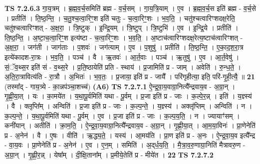 \documentclass[17pt]{extarticle}
\begin{document}
                  \newline
                                \textbf{ TS 7.2.6.3} \newline
                  गा॒य॒त्रम् । ब्र॒ह्म॒व॒र्च॒समिति॑ ब्रह्म - व॒र्च॒सम् । गा॒य॒त्रि॒याम् । ए॒व । ब्र॒ह्म॒व॒र्च॒स इति॑ ब्रह्म - व॒र्च॒से । प्रतीति॑ । ति॒ष्ठ॒न्ति॒ । च॒तु॒श्च॒त्वा॒रिꣳ॒॒श इति॑ चतुः - च॒त्वा॒रिꣳ॒॒शः । भ॒व॒ति॒ । चतु॑श्चत्वारिꣳशदक्ष॒रेति॒ चतु॑श्चत्वारिꣳशत् - अ॒क्ष॒रा॒ । त्रि॒ष्टुक् । इ॒न्द्रि॒यम् । त्रि॒ष्टुप् । त्रि॒ष्टुभि॑ । ए॒व । इ॒न्द्रि॒ये । प्रतीति॑ । ति॒ष्ठ॒न्ति॒ । अ॒ष्टा॒च॒त्वा॒रिꣳ॒॒श इत्य॑ष्टा - च॒त्वा॒रिꣳ॒॒शः । भ॒व॒ति॒ । अ॒ष्टाच॑त्वारिꣳशदक्ष॒रेत्य॒ष्टाच॑त्वारिꣳशत् - अ॒क्ष॒रा॒ । जग॑ती । जाग॑ताः । प॒शवः॑ । जग॑त्याम् । ए॒व । प॒शुषु॑ । प्रतीति॑ । ति॒ष्ठ॒न्ति॒ । ए॒का॒द॒श॒रा॒त्र इत्ये॑कादश-रा॒त्रः । भ॒व॒ति॒ । पञ्च॑ । वै । ऋ॒तवः॑ । आ॒र्त॒वाः । पञ्च॑ । ऋ॒तुषु॑ । ए॒व । आ॒र्त॒वेषु॑ । सं॒ॅव॒थ्स॒र इति॑ सं - व॒थ्स॒रे । प्र॒ति॒ष्ठायेति॑ प्रति - स्थाय॑ । प्र॒जामिति॑ प्र - जाम् । अवेति॑ । रु॒न्ध॒ते॒ । अ॒ति॒रा॒त्रावित्य॑ति - रा॒त्रौ । अ॒भितः॑ । भ॒व॒तः॒ । प्र॒जाया॒ इति॑ प्र - जायै᳚ । परि॑गृहीत्या॒ इति॒ परि॑-गृ॒ही॒त्यै॒ ॥ \textbf{  21 } \newline
                  \newline
                      (तस्मा᳚द् - गाय॒त्र्ये - का॒न्नप॑ञ्चा॒शच्च॑)  \textbf{(A6)} \newline \newline
                                \textbf{ TS 7.2.7.1} \newline
                  ऐ॒न्द्र॒वा॒य॒वाग्रा॒नित्यै᳚न्द्रवाय॒व - अ॒ग्रा॒न् । गृ॒ह्णी॒या॒त् । यः । का॒मये॑त । य॒था॒पू॒र्वमिति॑ यथा - पू॒र्वम् । प्र॒जा इति॑ प्र - जाः । क॒ल्पे॒र॒न्न् । इति॑ । य॒ज्ञ्स्य॑ । वै । क्लृप्ति᳚म् । अन्विति॑ । प्र॒जा इति॑ प्र - जाः । क॒ल्प॒न्ते॒ । य॒ज्ञ्स्य॑ । अक्लृ॑प्तिम् । अन्विति॑ । न । क॒ल्प॒न्ते॒ । य॒था॒पू॒र्वमिति॑ यथा - पू॒र्वम् । ए॒व । प्र॒जा इति॑ प्र - जाः । क॒ल्प॒य॒ति॒ । न । ज्यायाꣳ॑सम् । कनी॑यान् । अतीति॑ । क्रा॒म॒ति॒ । ऐ॒न्द्र॒वा॒य॒वाग्रा॒नित्यै᳚न्द्रवाय॒व - अ॒ग्रा॒न् । गृ॒ह्णी॒या॒त् । आ॒म॒या॒विनः॑ । प्रा॒णेनेति॑ प्र - अ॒नेन॑ । वै । ए॒षः । वीति॑ । ऋ॒द्ध्य॒ते॒ । यस्य॑ । आ॒मय॑ति । प्रा॒ण इति॑ प्र - अ॒नः । ऐ॒न्द्र॒वा॒य॒व इत्यै᳚न्द्र - वा॒य॒वः । प्रा॒णेनेति॑ प्र - अ॒नेन॑ । ए॒व । ए॒न॒म् । समिति॑ । अ॒द्‌र्ध॒य॒ति॒ । मै॒त्रा॒व॒रु॒णाग्रा॒निति॑ मैत्रावरु॒ण - अ॒ग्रा॒न् । गृ॒ह्णी॒र॒न्न् । येषा᳚म् । दी॒क्षि॒ताना᳚म् । प्र॒मीये॒तेति॑ प्र - मीये॑त । \textbf{  22} \newline
                  \newline
                                \textbf{ TS 7.2.7.2} \newline
\end{document}
